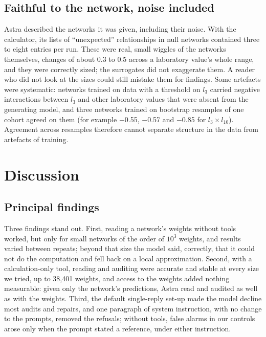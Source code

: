 \documentclass[11pt]{article}
\begin{document}
\begin{table}[t]
\centering
\caption{Other models. Left: the 105-weight networks without tools (pre-specified shape rules; three planted relationships). Right: the calculator with white-box access on the 3,457- and 38,401-weight networks and the audit.}
\label{tab:models}
\resizebox{\textwidth}{!}{}
\end{table}

\subsection{Faithful to the network, noise included}

Astra described the networks it was given, including their noise. With the calculator, its lists of ``unexpected'' relationships in null networks contained three to eight entries per run. These were real, small wiggles of the networks themselves, changes of about 0.3 to 0.5 across a laboratory value's whole range, and they were correctly sized; the surrogates did not exaggerate them. A reader who did not look at the sizes could still mistake them for findings. Some artefacts were systematic: networks trained on data with a threshold on $l_3$ carried negative interactions between $l_3$ and other laboratory values that were absent from the generating model, and three networks trained on bootstrap resamples of one cohort agreed on them (for example $-$0.55, $-$0.57 and $-$0.85 for $l_3\times l_{10}$). Agreement across resamples therefore cannot separate structure in the data from artefacts of training.

\section{Discussion}

\subsection{Principal findings}

Three findings stand out. First, reading a network's weights without tools worked, but only for small networks of the order of $10^3$ weights, and results varied between repeats; beyond that size the model said, correctly, that it could not do the computation and fell back on a local approximation. Second, with a calculation-only tool, reading and auditing were accurate and stable at every size we tried, up to 38,401 weights, and access to the weights added nothing measurable: given only the network's predictions, Astra read and audited as well as with the weights. Third, the default single-reply set-up made the model decline most audits and repairs, and one paragraph of system instruction, with no change to the prompts, removed the refusals; without tools, false alarms in our controls arose only when the prompt stated a reference, under either instruction.
\end{document}
